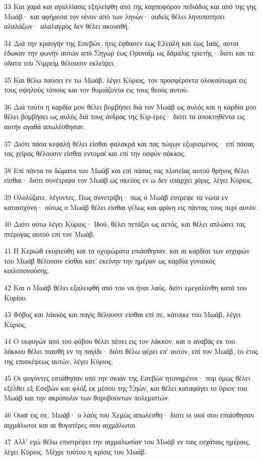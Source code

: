\par 33 Και χαρά και αγαλλίασις εξηλείφθη από της καρποφόρου πεδιάδος και από της γης Μωάβ· και αφήρεσα τον οίνον από των ληνών· ουδείς θέλει ληνοπατήσει αλαλάζων· αλαλαγμός δεν θέλει ακουσθή.
\par 34 Διά την κραυγήν της Εσεβών, ήτις έφθασεν έως Ελεαλή και έως Ιαάς, αυτοί έδωκαν την φωνήν αυτών από Σηγώρ έως Οροναΐμ ως δάμαλις τριετής· διότι και τα ύδατα του Νιμρείμ θέλουσιν εκλείψει.
\par 35 Και θέλω παύσει εν τω Μωάβ, λέγει Κύριος, τον προσφέροντα ολοκαύτωμα εις τους υψηλούς τόπους και τον θυμιάζοντα εις τους θεούς αυτού.
\par 36 Διά τούτο η καρδία μου θέλει βομβήσει διά τον Μωάβ ως αυλός και η καρδία μου θέλει βομβήσει ως αυλός διά τους άνδρας της Κιρ-έρες· διότι τα αποκτηθέντα εις αυτήν αγαθά απωλέσθησαν.
\par 37 Διότι πάσα κεφαλή θέλει είσθαι φαλακρά και πας πώγων εξυρισμένος· επί πάσας τας χείρας θέλουσιν είσθαι εντομαί και επί την οσφύν σάκκος.
\par 38 Επί πάντα τα δώματα του Μωάβ και επί πάσας τας πλατείας αυτού θρήνος θέλει είσθαι· διότι συνέτριψα τον Μωάβ ως σκεύος εν ω δεν υπάρχει χάρις, λέγει Κύριος.
\par 39 Ολολύξατε, λέγοντες, Πως συνετρίβη· πως ο Μωάβ έστρεψε τα νώτα εν καταισχύνη· ούτως ο Μωάβ θέλει είσθαι γέλως και φρίκη εις πάντας τους περί αυτόν.
\par 40 Διότι ούτω λέγει Κύριος· Ιδού, θέλει πετάξει ως αετός, και θέλει απλώσει τας πτέρυγας αυτού επί τον Μωάβ.
\par 41 Η Κεριώθ εκυριεύθη και τα οχυρώματα επιάσθησαν, και αι καρδίαι των ισχυρών του Μωάβ θέλουσιν είσθαι κατ' εκείνην την ημέραν ως καρδία γυναικός κοιλοπονούσης.
\par 42 Και ο Μωάβ θέλει εξαλειφθή από του να ήναι λαός, διότι εμεγαλύνθη κατά του Κυρίου.
\par 43 Φόβος και λάκκος και παγίς θέλουσιν είσθαι επί σε, κάτοικε του Μωάβ, λέγει Κύριος.
\par 44 Ο εκφυγών από του φόβου θέλει πέσει εις τον λάκκον, και ο αναβάς εκ του λάκκου θέλει πιασθή εν τη παγίδι· διότι θέλω φέρει επ' αυτόν, επί τον Μωάβ, το έτος της επισκέψεως αυτών, λέγει Κύριος.
\par 45 Οι φυγόντες εστάθησαν υπό την σκιάν της Εσεβών ητονημένοι· πυρ όμως θέλει εξέλθει εξ Εσεβών και φλόξ εκ μέσου της Σηών, και θέλει καταφάγει το όριον του Μωάβ και την ακρόπολιν των θορυβούντων πολεμιστών.
\par 46 Ουαί εις σε, Μωάβ· ο λαός του Χεμώς απωλέσθη· διότι οι υιοί σου επιάσθησαν αιχμάλωτοι και αι θυγατέρες σου αιχμάλωτοι.
\par 47 Αλλ' εγώ θέλω επιστρέψει την αιχμαλωσίαν του Μωάβ εν ταις εσχάταις ημέραις, λέγει Κύριος. Μέχρι τούτου η κρίσις του Μωάβ.

